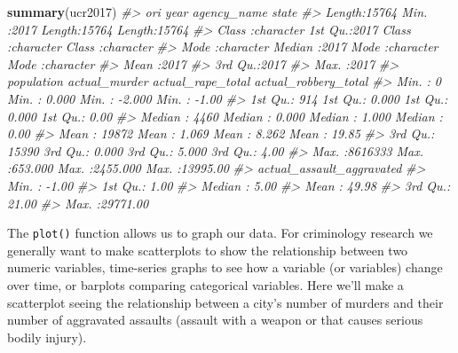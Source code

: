 \documentclass[
  12pt,
]{book}
\newenvironment{Shaded}{\begin{snugshade}}{\end{snugshade}}
\newcommand{\CommentTok}[1]{\textcolor[rgb]{0.37,0.37,0.37}{\textit{#1}}}
\newcommand{\KeywordTok}[1]{\textcolor[rgb]{0.27,0.27,0.27}{\textbf{#1}}}
\newcommand{\NormalTok}[1]{#1}
\begin{document}
\begin{Shaded}
\begin{Highlighting}[]
\KeywordTok{summary}\NormalTok{(ucr2017)}
\CommentTok{\#\textgreater{}      ori                 year      agency\_name           state          }
\CommentTok{\#\textgreater{}  Length:15764       Min.   :2017   Length:15764       Length:15764      }
\CommentTok{\#\textgreater{}  Class :character   1st Qu.:2017   Class :character   Class :character  }
\CommentTok{\#\textgreater{}  Mode  :character   Median :2017   Mode  :character   Mode  :character  }
\CommentTok{\#\textgreater{}                     Mean   :2017                                        }
\CommentTok{\#\textgreater{}                     3rd Qu.:2017                                        }
\CommentTok{\#\textgreater{}                     Max.   :2017                                        }
\CommentTok{\#\textgreater{}    population      actual\_murder     actual\_rape\_total  actual\_robbery\_total}
\CommentTok{\#\textgreater{}  Min.   :      0   Min.   :  0.000   Min.   :  {-}2.000   Min.   :   {-}1.00    }
\CommentTok{\#\textgreater{}  1st Qu.:    914   1st Qu.:  0.000   1st Qu.:   0.000   1st Qu.:    0.00    }
\CommentTok{\#\textgreater{}  Median :   4460   Median :  0.000   Median :   1.000   Median :    0.00    }
\CommentTok{\#\textgreater{}  Mean   :  19872   Mean   :  1.069   Mean   :   8.262   Mean   :   19.85    }
\CommentTok{\#\textgreater{}  3rd Qu.:  15390   3rd Qu.:  0.000   3rd Qu.:   5.000   3rd Qu.:    4.00    }
\CommentTok{\#\textgreater{}  Max.   :8616333   Max.   :653.000   Max.   :2455.000   Max.   :13995.00    }
\CommentTok{\#\textgreater{}  actual\_assault\_aggravated}
\CommentTok{\#\textgreater{}  Min.   :   {-}1.00         }
\CommentTok{\#\textgreater{}  1st Qu.:    1.00         }
\CommentTok{\#\textgreater{}  Median :    5.00         }
\CommentTok{\#\textgreater{}  Mean   :   49.98         }
\CommentTok{\#\textgreater{}  3rd Qu.:   21.00         }
\CommentTok{\#\textgreater{}  Max.   :29771.00}
\end{Highlighting}
\end{Shaded}

The \texttt{plot()} function allows us to graph our data. For criminology research we generally want to make scatterplots to show the relationship between two numeric variables, time-series graphs to see how a variable (or variables) change over time, or barplots comparing categorical variables. Here we'll make a scatterplot seeing the relationship between a city's number of murders and their number of aggravated assaults (assault with a weapon or that causes serious bodily injury).
\end{document}
